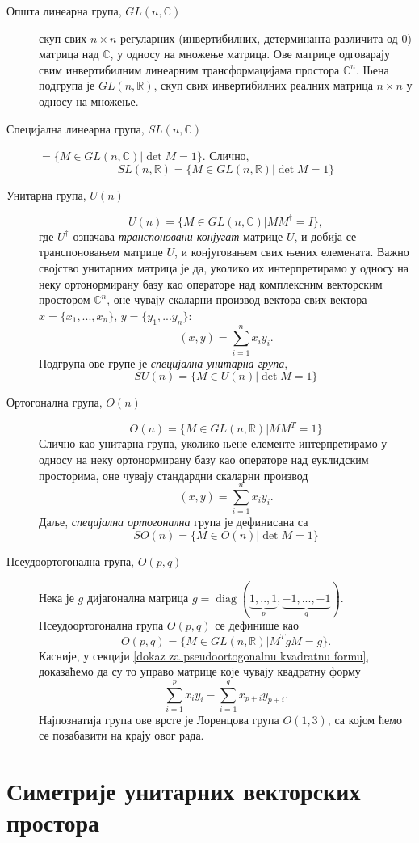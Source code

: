 \documentclass{report}
\theoremstyle{plain}
\theoremstyle{definition}
\begin{document}
\begin{description}
  \item[Општа линеарна група, $GL(n, \mathbb{C})$]  скуп свих $n\times n$ регуларних (инвертибилних, детерминанта различита од 0) матрица над $\mathbb{C}$, у односу на множење матрица. Ове матрице одговарају свим инвертибилним линеарним трансформацијама простора $\mathbb{C}^n$. Њена подгрупа је $GL(n, \mathbb{R})$, скуп свих инвертибилних реалних матрица $n\times n$ у односу на множење.
  \item[Специјална линеарна група, $SL(n, \mathbb{C})$] $ = \{M\in GL(n, \mathbb{C})|\det M = 1\}$. Слично, 
  $$SL(n, \mathbb{R}) = \{M\in GL(n, \mathbb{R})|\det M = 1\}$$
  \item[Унитарна група, $U(n)$] 
  $$U(n) = \{M\in GL(n, \mathbb{C})|MM^\dag = I\},$$
  где $U^\dag$ означава \emph{транспоновани конјугат} матрице $U$, и добија се транспоновањем матрице $U$, и конјуговањем свих њених елемената. Важно својство унитарних матрица је да, уколико их интерпретирамо у односу на неку ортонормирану базу као операторе над комплексним векторским простором $\mathbb{C}^n$, оне чувају скаларни производ вектора свих вектора $x = \{x_1, ..., x_n\}$, $y = \{y_1, ...y_n\}$:
  $$(x, y) = \sum_{i=1}^n x_i \overline{y}_i.$$
  Подгрупа ове групе је \emph{специјална унитарна група}, 
  $$SU(n) = \{M\in U(n)|\det M = 1\}$$
  \item[Ортогонална група, $O(n)$] 
  $$O(n) = \{M\in GL(n, \mathbb{R})|MM^T = 1\}$$
  Слично као унитарна група, уколико њене елементе интерпретирамо у односу на неку ортонормирану базу као операторе над еуклидским просторима, оне чувају стандардни скаларни производ
  $$(x, y) = \sum_{i=1}^n x_i y_i.$$
  Даље, \emph{специјална ортогонална} група је дефинисана са
  $$SO(n) = \{M\in O(n)|\det M = 1\}$$
  \item[Псеудоортогонална група, $O(p, q)$] Нека је $g$ дијагонална матрица $g = \operatorname{diag}(\underbrace{1, .., 1}_p, \underbrace{-1, ..., -1}_q)$. Псеудоортогонална група $O(p, q)$ се дефинише као
      $$O(p, q) = \{M\in GL(n, \mathbb{R})|M^TgM = g\}.$$
      Касније, у секцији \ref{dokaz za pseudoortogonalnu kvadratnu formu}, доказаћемо да су то управо матрице које чувају квадратну форму
      $$\sum_{i=1}^p x_iy_i - \sum_{i=1}^q x_{p+i}y_{p+i}.$$
  Најпознатија група ове врсте је Лоренцова група $O(1, 3)$, са којом ћемо се позабавити на крају овог рада.
\end{description}

\section{Симетрије унитарних векторских простора}
\end{document}
